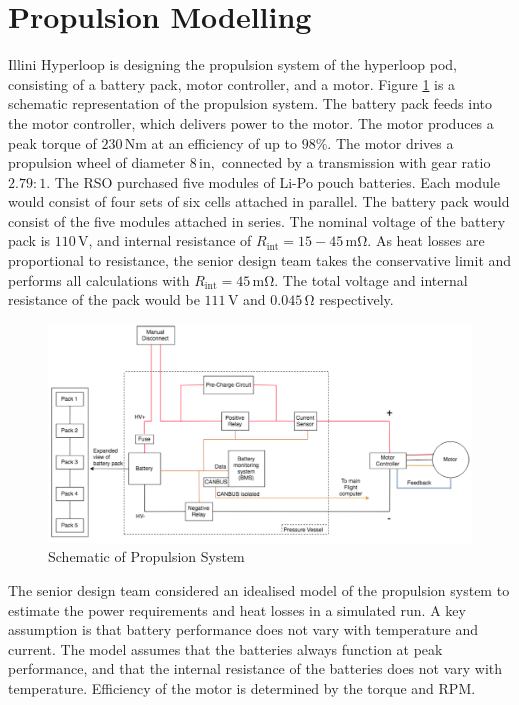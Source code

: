 \documentclass[11pt]{article}
\numberwithin{equation}{subsection} %
\newcommand{\unit}[1]{\ensuremath{\, \mathrm{#1}}}             %
\begin{document}
\section{Propulsion Modelling}\label{prop}
Illini Hyperloop is designing the propulsion system of the hyperloop pod, consisting of a battery pack, motor controller, and a motor. Figure \ref{fig:schematic} is a schematic representation of the propulsion system. The battery pack feeds into the motor controller, which delivers power to the motor. The motor produces a peak torque of $230\unit{Nm}$ at an efficiency of up to $98\%.$ The motor drives a propulsion wheel of diameter $8\unit{in},$ connected by a transmission with gear ratio $2.79:1$. The RSO purchased five modules of Li-Po pouch batteries. Each module would consist of four sets of six cells attached in parallel. The battery pack would consist of the five modules attached in series. The nominal voltage of the battery pack is $110\unit{V}$, and internal resistance of $R_\text{int}=15-45\unit{m\Omega}$. As heat losses are proportional to resistance, the senior design team takes the conservative limit and performs all calculations with $R_\text{int}=45\unit{m\Omega}$. The total voltage and internal resistance of the pack would be $111\unit{V}$ and $0.045\unit{\Omega}$ respectively.

\begin{figure}[!htb]
    \centering
    \includegraphics[width=1.0\textwidth]{fig/overview.png}
    \caption{Schematic of Propulsion System}
    \label{fig:schematic}
\end{figure}

The senior design team considered an idealised model of the propulsion system to estimate the power requirements and heat losses in a simulated run. A key assumption is that battery performance does not vary with temperature and current. The model assumes that the batteries always function at peak performance, and that the internal resistance of the batteries does not vary with temperature. Efficiency of the motor is determined by the torque and RPM. 
\end{document}
